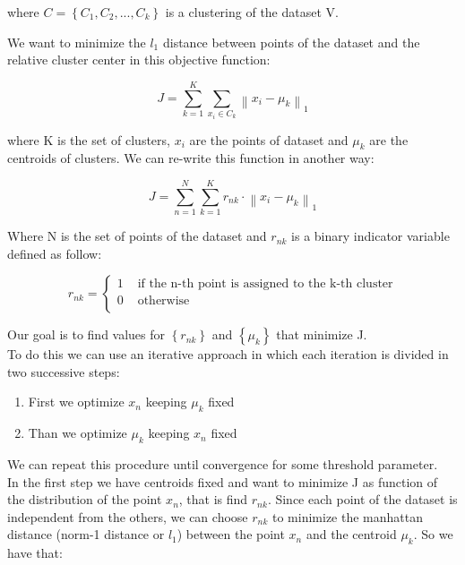 \documentclass{article}
\newcommand{\norm}[1]{\left\lVert#1\right\rVert}
\begin{document}
where $C = \left\{ C_{1}, C_{2}, ... , C_{k}   \right\}$ is a clustering of the dataset V.

We want to minimize the $l_{1}$ distance between points of the dataset and the relative cluster center in this objective function:

\begin{equation} \label{eq:objectiveFunc1}
J = \sum_{k=1}^{K}  \sum_{x_{i} \in C_{k}}  \norm { x_{i} - \mu_{k} }_{1}
\end{equation}

where K is the set of clusters, $x_{i}$ are the points of dataset and $\mu_{k}$ are the centroids of clusters. We can re-write this function in another way:

\begin{equation} \label{eq:objectiveFunc2}
J = \sum_{n=1}^{N}  \sum_{k=1}^{K} r_{nk} \cdot \norm{ x_{i} - \mu_{k} }_{1}
\end{equation}

Where N is the set of points of the dataset and  $r_{nk}$ is a binary indicator variable defined as follow:

\begin{equation} \label{eq:rnk}
r_{nk} = 
\begin{cases}
	1 & \text{ if the n-th point is assigned to the k-th cluster} \\
	0 & \text{ otherwise } \\
\end{cases}
\end{equation}

Our goal is to find values for $ \left\{r_{nk} \right\} $ and $ \left\{ \mu_{k} \right\} $ that minimize J. \\
To do this we can use an iterative approach in which each iteration is divided in two successive steps:
\begin{enumerate}
	\item First we optimize $x_{n}$ keeping $\mu_{k}$ fixed 
	\item Than we optimize $\mu_{k}$ keeping $x_{n}$ fixed
\end{enumerate}

We can repeat this procedure until convergence for some threshold parameter. \\

In the first step we have centroids fixed and want to minimize J as function of the distribution of the point $x_{n}$, that is find $r_{nk}$. 
Since each point of the dataset is independent from the others, we can choose $r_{nk}$ to minimize the manhattan distance (norm-1 distance or $l_{1}$)
between the point $x_{n}$ and the centroid $\mu_{k}$. So we have that:
\end{document}
